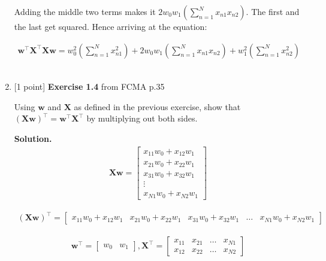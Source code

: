 \documentclass[10pt]{article}
\begin{document}
\begin{enumerate}
Adding the middle two terms makes it $2w_0w_1 \left( \sum_{n=1}^N x_{n1}x_{n2} \right)$. The first and the last get squared. Hence arriving at the equation:

\begin{eqnarray*}
\mathbf{w}^\top\mathbf{X}^\top\mathbf{X}\mathbf{w} = w_0^2 \left( \sum_{n=1}^N x_{n1}^2 \right) + 2w_0w_1 \left( \sum_{n=1}^N x_{n1}x_{n2} \right) + w_1^2 \left( \sum_{n=1}^N x_{n2}^2 \right)
\end{eqnarray*} \\


\item \label{prob:4} [1 point]
{\bf Exercise 1.4} from FCMA p.35

Using $\mathbf{w}$ and $\mathbf{X}$ as defined in the previous exercise, show that ${(\mathbf{X}\mathbf{w})}^\top = {\mathbf{w}}^\top{\mathbf{X}}^\top$ by multiplying out both sides.

{\bf Solution.}  
\begin{eqnarray*}
\mathbf{X}\mathbf{w} = 
	\begin{bmatrix}
    x_{11}w_0+ x_{12}w_1 \\[0.3em]
    x_{21}w_0+ x_{22}w_1 \\[0.3em]
    x_{31}w_0+ x_{32}w_1 \\[0.3em]
    \vdots \\[0.3em]
    x_{N1}w_0+x_{N2}w_1
    \end{bmatrix}
\end{eqnarray*}

\begin{eqnarray*}
\left(\mathbf{X}\mathbf{w}\right)^\top = 
	\begin{bmatrix}
    x_{11}w_0+ x_{12}w_1 &
    x_{21}w_0+ x_{22}w_1 &
    x_{31}w_0+ x_{32}w_1 &
    \hdots &
    x_{N1}w_0+x_{N2}w_1
    \end{bmatrix}
\end{eqnarray*}

\begin{eqnarray*}
\mathbf{w}^\top = 
    \begin{bmatrix}
    w_0  & w_1
    \end{bmatrix}
    ,
\mathbf{X}^\top = 
    \begin{bmatrix}
    x_{11} & x_{21} & \hdots & x_{N1}\\[0.3em]
    x_{12} & x_{22} & \hdots & x_{N2}
    \end{bmatrix}
\end{eqnarray*}


\end{enumerate}
\end{document}
